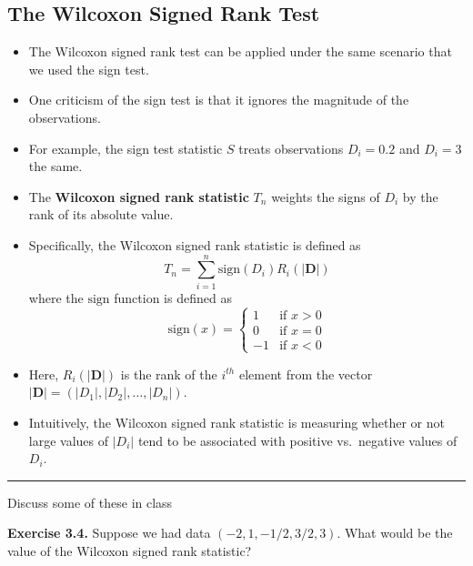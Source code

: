 \documentclass[]{book}
\begin{document}
\hypertarget{the-wilcoxon-signed-rank-test}{%
\subsection{The Wilcoxon Signed Rank Test}\label{the-wilcoxon-signed-rank-test}}

\begin{itemize}
\item
  The Wilcoxon signed rank test can be applied
  under the same scenario that we used the sign test.
\item
  One criticism of the sign test is that it ignores the magnitude
  of the observations.
\item
  For example, the sign test statistic \(S\) treats observations
  \(D_{i} = 0.2\) and \(D_{i}=3\) the same.
\item
  The \textbf{Wilcoxon signed rank statistic} \(T_{n}\) weights the
  signs of \(D_{i}\) by the rank of its absolute value.
\item
  Specifically, the Wilcoxon signed rank statistic is defined as
  \begin{equation}
  T_{n} = \sum_{i=1}^{n} \textrm{sign}( D_{i}) R_{i}( |\mathbf{D}| )
  \end{equation}
  where the \(\textrm{sign}\) function is defined as
  \begin{equation}
  \textrm{sign}(x) = \begin{cases}
  1 & \textrm{if } x > 0 \\
  0 & \textrm{if } x = 0 \\
  -1 & \textrm{if } x < 0
  \end{cases}
  \end{equation}
\item
  Here, \(R_{i}( |\mathbf{D}| )\) is the rank of the \(i^{th}\) element from the vector
  \(|\mathbf{D}| = (|D_{1}|, |D_{2}|, \ldots, |D_{n}|)\).
\item
  Intuitively, the Wilcoxon signed rank statistic is measuring whether
  or not large values of \(|D_{i}|\) tend to be associated with positive
  vs.~negative values of \(D_{i}\).
\end{itemize}

\begin{center}\rule{0.5\linewidth}{\linethickness}\end{center}

Discuss some of these in class

\textbf{Exercise 3.4.} Suppose we had data \((-2, 1, -1/2, 3/2, 3)\). What would
be the value of the Wilcoxon signed rank statistic?
\end{document}
